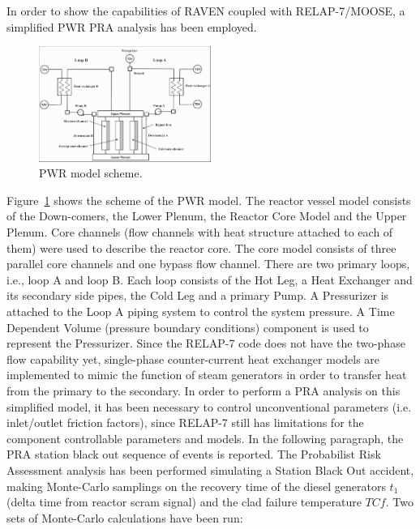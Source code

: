 \documentclass{mc2013}
\begin{document}
In order to show the capabilities of RAVEN coupled with RELAP-7/MOOSE, a simplified PWR PRA analysis has been employed.
\begin{figure}[h]
   \centering
    \includegraphics[width=0.5\textwidth]{figures/PWR_TMI_SCHEME.PNG}
    \caption{PWR model scheme.}
    \label{fig:PWRmodel}
\end{figure}
Figure~\ref{fig:PWRmodel} shows the scheme of the PWR model. The reactor vessel model consists of the Down-comers, the Lower Plenum, the Reactor Core Model and the Upper Plenum. Core channels (flow channels with heat structure attached to each of them) were used to describe the reactor core. The core model consists of three parallel core channels and one bypass flow channel. 
There are two primary loops, i.e., loop A and loop B. Each loop consists of the Hot Leg, a Heat Exchanger and its secondary side pipes, the Cold Leg and a primary Pump. A Pressurizer is attached to the Loop A piping system to control the system pressure. A Time Dependent Volume (pressure boundary conditions) component is used to represent the Pressurizer. Since the RELAP-7 code does not have the two-phase flow capability yet, single-phase counter-current heat exchanger models are implemented to mimic the function of steam generators in order to transfer heat from the primary to the secondary.
In order to perform a PRA analysis on this simplified model, it has been necessary to control unconventional parameters (i.e. inlet/outlet friction factors), since RELAP-7 still has limitations for the component controllable parameters and models. In the following paragraph, the PRA station black out sequence of events is reported. 
The Probabilist Risk Assessment analysis has been performed simulating a Station Black Out accident, making Monte-Carlo samplings on the recovery time of the diesel generators  $t_{1}$ (delta time from reactor scram signal) and the clad failure temperature $TC{f}$. Two sets of Monte-Carlo calculations have been run:
\end{document}
